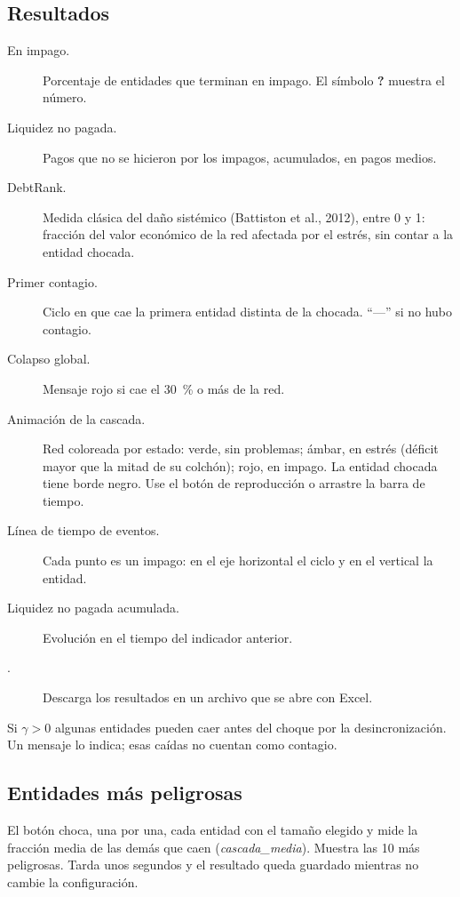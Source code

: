\subsection*{Resultados}
\begin{description}
\item[En impago.] Porcentaje de entidades que terminan en impago. El símbolo \textbf{?}
muestra el número.
\item[Liquidez no pagada.] Pagos que no se hicieron por los impagos, acumulados, en pagos
medios.
\item[DebtRank.] Medida clásica del daño sistémico (Battiston et al., 2012), entre 0 y
1: fracción del valor económico de la red afectada por el estrés, sin contar a la
entidad chocada.
\item[Primer contagio.] Ciclo en que cae la primera entidad distinta de la chocada.
``—'' si no hubo contagio.
\item[Colapso global.] Mensaje rojo si cae el 30~\% o más de la red.
\item[Animación de la cascada.] Red coloreada por estado: \textcolor{verde}{verde}, sin
problemas; \textcolor{ambar}{ámbar}, en estrés (déficit mayor que la mitad de su
colchón); \textcolor{rojo}{rojo}, en impago. La entidad chocada tiene borde negro. Use el
botón de reproducción o arrastre la barra de tiempo.
\item[Línea de tiempo de eventos.] Cada punto es un impago: en el eje horizontal el
ciclo y en el vertical la entidad.
\item[Liquidez no pagada acumulada.] Evolución en el tiempo del indicador anterior.
\item[.] Descarga los resultados en un
archivo que se abre con Excel.
\end{description}

\begin{aviso}
Si $\gamma>0$ algunas entidades pueden caer antes del choque por la desincronización.
Un mensaje lo indica; esas caídas no cuentan como contagio.
\end{aviso}


\subsection*{Entidades más peligrosas}
El botón  choca, una por una, cada entidad con el tamaño elegido
y mide la fracción media de las demás que caen (\emph{cascada\_media}). Muestra las 10 más
peligrosas. Tarda unos segundos y el resultado queda guardado mientras no cambie la
configuración.

